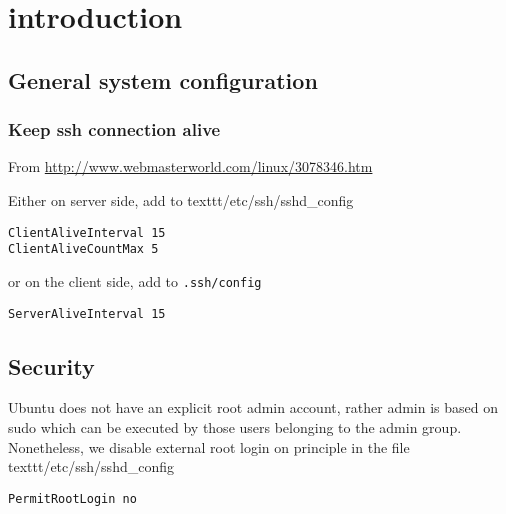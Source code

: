 \chapter{introduction}


\section{General system configuration}

\subsection{Keep ssh connection alive}


From \url{http://www.webmasterworld.com/linux/3078346.htm}

Either on server side, add to texttt{/etc/ssh/sshd\_config} 
\begin{verbatim} 
ClientAliveInterval 15
ClientAliveCountMax 5 
\end{verbatim} 
or on the client side, add to \texttt{.ssh/config}
\begin{verbatim} 
ServerAliveInterval 15
\end{verbatim} 


\section{Security}

Ubuntu does not have an explicit root admin account, rather
admin is based on sudo which can be executed by those users belonging to
the admin group.
Nonetheless, we disable external root login on principle in the file 
texttt{/etc/ssh/sshd\_config} 
\begin{verbatim} 
PermitRootLogin no
\end{verbatim}


